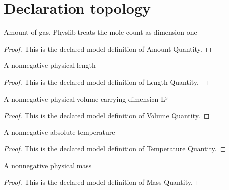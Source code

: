 \section{Declaration topology}
\begin{definition}
  \label{def:physics:phyx-mini-0436:phyxminiproblems-problemphyxmini0436-amountquantity}
  Amount of gas. Physlib treats the mole count as dimension one
\end{definition}
\begin{proof}
  This is the declared model definition of Amount Quantity.
\end{proof}
\begin{definition}
  \label{def:physics:phyx-mini-0436:phyxminiproblems-problemphyxmini0436-lengthquantity}
  A nonnegative physical length
\end{definition}
\begin{proof}
  This is the declared model definition of Length Quantity.
\end{proof}
\begin{definition}
  \label{def:physics:phyx-mini-0436:phyxminiproblems-problemphyxmini0436-volumequantity}
  A nonnegative physical volume carrying dimension L³
\end{definition}
\begin{proof}
  This is the declared model definition of Volume Quantity.
\end{proof}
\begin{definition}
  \label{def:physics:phyx-mini-0436:phyxminiproblems-problemphyxmini0436-temperaturequantity}
  A nonnegative absolute temperature
\end{definition}
\begin{proof}
  This is the declared model definition of Temperature Quantity.
\end{proof}
\begin{definition}
  \label{def:physics:phyx-mini-0436:phyxminiproblems-problemphyxmini0436-massquantity}
  A nonnegative physical mass
\end{definition}
\begin{proof}
  This is the declared model definition of Mass Quantity.
\end{proof}
